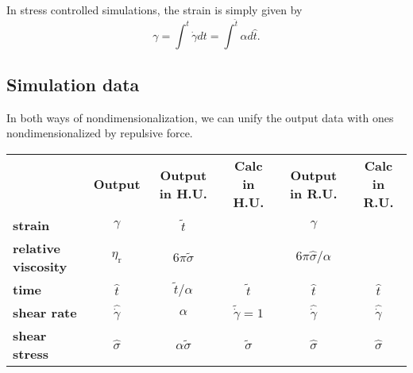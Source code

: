 \documentclass[fontsize=11pt]{scrartcl}
\begin{document}
In stress controlled simulations,
the strain is simply given by
\begin{equation}
 \gamma
 = \int^{t} \dot{\gamma} dt
 = \int^{\hat{t}} \alpha d\hat{t}.
\end{equation}

\subsection*{Simulation data}

In both ways of nondimensionalization,
we can unify the output data with ones nondimensionalized by repulsive force.

\begin{center}
  \begin{tabular}{lccccc}
    &   {\bf Output} & {\bf Output in H.U.} &  {\bf Calc in H.U.}
    & {\bf Output in R.U.} &  {\bf Calc in R.U.}
    \\
    {\bf strain} & $\gamma $ & $ \tilde{t}$
    & & $\gamma $
    \\
    {\bf relative viscosity}   &  $ \eta_{\mathrm{r}}$ &
    $6 \pi \tilde{\sigma}$ &  &
    $6 \pi \hat{\sigma}/\alpha$  & \\
    {\bf time}  & $\hat{t}$ & $ \tilde{t}/\alpha$
    &  $\tilde{t} $ & $\hat{t}$ & $\hat{t}$\\
    {\bf shear rate}& $\hat{\dot{\gamma}}$ & $\alpha$ & $\tilde{\dot{\gamma}} = 1$
    & $\hat{\dot{\gamma}}$ & $\hat{\dot{\gamma}}$  \\
    {\bf shear stress} & $\hat{\sigma}$
       & $\alpha\tilde{\sigma}$  & $\tilde{\sigma} $  &
      $\hat{\sigma}$ &  $\hat{\sigma}$ 
  \end{tabular} 
\end{center}
\end{document}
